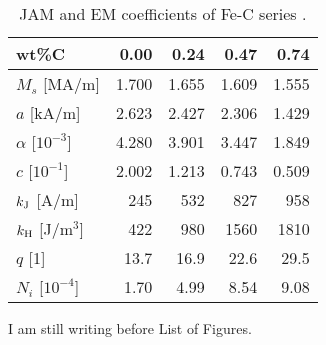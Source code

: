 \documentclass[12pt,fleqn]{article}
\def\bc{\begin{center}}
\def\ec{\end{center}}
\begin{document}










\begin{table}[h]
      \renewcommand{\thetable}{\Roman{table}}
      \caption{JAM and EM coefficients of Fe-C series \cite{TMAG}.}
      \label{C}
      \bc
      \begin{tabular}{ l r r r r }
      \hline
      wt\%C                  &   0.00 &   0.24 &   0.47 &   0.74 \\ \hline
      $M_s$ [MA/m]           &  1.700 &  1.655 &  1.609 &  1.555 \\
      $a$ [kA/m]             &  2.623 &  2.427 &  2.306 &  1.429 \\
      $\alpha$ [$10^{-3}$]   &  4.280 &  3.901 &  3.447 &  1.849 \\
      $c$ [$10^{-1}$]        &  2.002 &  1.213 &  0.743 &  0.509 \\
      $k_{\rm J}$ [A/m]      &    245 &    532 &    827 &    958 \\ \hline
      $k_{\rm H}$ [J/m$^{3}$]&    422 &    980 &   1560 &   1810 \\
      $q$ [1]                &   13.7 &   16.9 &   22.6 &   29.5 \\
      $N_i$ [$10^{-4}$]      &   1.70 &   4.99 &   8.54 &   9.08 \\ \hline
      \end{tabular}
      \ec
\end{table}

\cleardoublepage

I am still writing before List of Figures.

\listoffigures

\cleardoublepage


\end{document}
